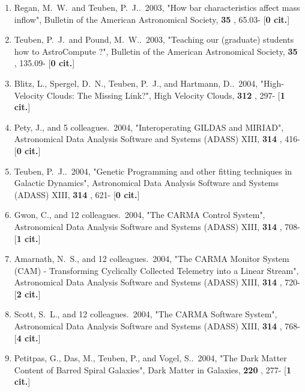\documentclass[11pt,letterpaper]{article}
\begin{document}
\begin{enumerate}[resume,label=\textbf{\arabic*}.]
\item  
Regan, M.~W.~and Teuben, P.~J..\  2003,  "How bar characteristics affect 
mass inflow", Bulletin of the American Astronomical Society,  {\bf 35} , 
65.03- [{\bf 0 cit.}] 

\item  
Teuben, P.~J.~and Pound, M.~W..\  2003,  "Teaching our (graduate) students 
how to AstroCompute ?", Bulletin of the American Astronomical Society,  
{\bf 35} , 135.09- [{\bf 0 cit.}] 

\item  
Blitz, L., Spergel, D.~N., Teuben, P.~J., and Hartmann, D..\  2004,  
"High-Velocity Clouds: The Missing Link?", High Velocity Clouds,  {\bf 312} 
, 297- [{\bf 1 cit.}] 

\item  
Pety, J., and 5 colleagues.\  2004,  "Interoperating GILDAS and MIRIAD", 
Astronomical Data Analysis Software and Systems (ADASS) XIII,  {\bf 314} , 
416- [{\bf 0 cit.}] 

\item  
Teuben, P.~J..\  2004,  "Genetic Programming and other fitting techniques 
in Galactic Dynamics", Astronomical Data Analysis Software and Systems 
(ADASS) XIII,  {\bf 314} , 621- [{\bf 0 cit.}] 

\item  
Gwon, C., and 12 colleagues.\  2004,  "The CARMA Control System", 
Astronomical Data Analysis Software and Systems (ADASS) XIII,  {\bf 314} , 
708- [{\bf 1 cit.}] 

\item  
Amarnath, N.~S., and 12 colleagues.\  2004,  "The CARMA Monitor System 
(CAM) - Transforming Cyclically Collected Telemetry into a Linear Stream", 
Astronomical Data Analysis Software and Systems (ADASS) XIII,  {\bf 314} , 
720- [{\bf 2 cit.}] 

\item  
Scott, S.~L., and 12 colleagues.\  2004,  "The CARMA Software System", 
Astronomical Data Analysis Software and Systems (ADASS) XIII,  {\bf 314} , 
768- [{\bf 4 cit.}] 

\item  
Petitpas, G., Das, M., Teuben, P., and Vogel, S..\  2004,  "The Dark Matter 
Content of Barred Spiral Galaxies", Dark Matter in Galaxies,  {\bf 220} , 
277- [{\bf 1 cit.}] 


\end{enumerate}
\end{document}
